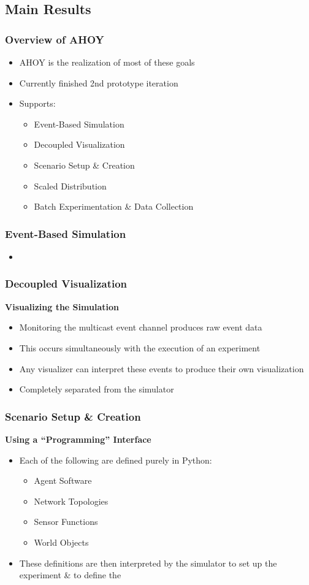 \documentclass[mathserif]{beamer}
\begin{document}
\subsection{Main Results}

\frame
{
    \frametitle{Overview of AHOY}
    \begin{itemize}
        \item AHOY is the realization of most of these goals
        \item Currently finished 2nd prototype iteration
        \item Supports:
        \begin{itemize}
            \item Event-Based Simulation
            \item Decoupled Visualization
            \item Scenario Setup \& Creation
            \item Scaled Distribution
            \item Batch Experimentation \& Data Collection
        \end{itemize}
    \end{itemize}
}

\frame
{
    \frametitle{Event-Based Simulation}
    \textbf{}
    \begin{itemize}
        \item
    \end{itemize}
}


\frame
{
    \frametitle{Decoupled Visualization}
    \textbf{Visualizing the Simulation}
    \begin{itemize}
        \item Monitoring the multicast event channel produces raw event data
        \item This occurs simultaneously with the execution of an experiment
        \item Any visualizer can interpret these events to produce their own visualization
        \item Completely separated from the simulator
    \end{itemize}
}

\frame
{
    \frametitle{Scenario Setup \& Creation}
    \textbf{Using a ``Programming'' Interface}
    \begin{itemize}
        \item Each of the following are defined purely in Python:
        \begin{itemize}
            \item Agent Software
            \item Network Topologies
            \item Sensor Functions
            \item World Objects
        \end{itemize}
        \item These definitions are then interpreted by the simulator to set up the experiment \& to define the 
    \end{itemize}

}
\end{document}

